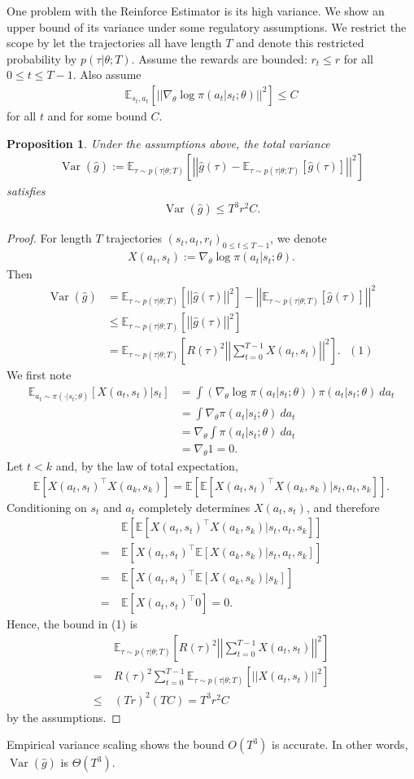 \documentclass[12pt,oneside]{article}
\newcommand{\norm}[1]{\left|\left|#1\right|\right|}
\newcommand{\BE}[0]{\mathbb{E}}
\newcommand{\ali}[1]{\begin{align*}#1\end{align*}}
\DeclareMathOperator{\Var}{Var}
\theoremstyle{plain}
\newtheorem*{prop}{Proposition}
\theoremstyle{remark}
\begin{document}
One problem with the Reinforce Estimator is its high variance. We show an upper bound of its variance under some regulatory assumptions. We restrict the scope by let the trajectories all have length $T$ and denote this restricted probability by $p(\tau | \theta; T)$. Assume the rewards are bounded: $r_t \leq r$ for all $0 \leq t \leq T-1$. Also assume 
\ali{\BE_{s_t, a_t} \left[ \norm{\nabla_\theta \log \pi(a_t|s_t;\theta)}^2 \right] \leq C}
for all $t$ and for some bound $C$.

\begin{prop}
Under the assumptions above, the total variance 
\ali{\Var(\hat{g}) := \BE_{\tau \sim p(\tau | \theta; T)} \left[ \norm{\hat{g}(\tau) - \BE_{\tau \sim p(\tau | \theta; T)} \left[\hat{g}(\tau) \right]}^2 \right]}
satisfies
\ali{\Var(\hat{g}) \leq T^3r^2C.}
\end{prop}
\begin{proof}
For length $T$ trajectories $(s_t, a_t, r_t)_{0 \leq t \leq T-1}$, we denote 
\ali{X(a_t, s_t) := \nabla_\theta \log \pi(a_t|s_t;\theta).}
Then
\ali{\Var(\hat{g}) &= \BE_{\tau \sim p(\tau | \theta; T)} \left[ \norm{\hat{g}(\tau)}^2 \right] - \norm{\BE_{\tau \sim p(\tau | \theta; T)} \left[ \hat{g}(\tau) \right]}^2 \\
                   &\leq \BE_{\tau \sim p(\tau | \theta; T)} \left[ \norm{\hat{g}(\tau)}^2 \right] \\
                   &= \BE_{\tau \sim p(\tau | \theta; T)} \left[ R(\tau)^2 \norm{\sum_{t=0}^{T-1} X(a_t, s_t)}^2  \right]. \ \ \ (1)}
We first note
\ali{\BE_{a_t \sim \pi(\cdot|s_t;\theta)} \left[ X(a_t, s_t) | s_t \right] &= \int (\nabla_\theta \log \pi(a_t|s_t;\theta)) \pi(a_t|s_t;\theta) \ d a_t\\
             &= \int \nabla_\theta \pi(a_t|s_t;\theta) \ d a_t\\
             &= \nabla_\theta \int \pi(a_t|s_t;\theta) \ d a_t \\
             &= \nabla_\theta 1 = 0. }
Let $t < k$ and, by the law of total expectation,
\ali{\BE \left[X(a_t, s_t)^\top X(a_k, s_k)\right] = \BE \left[ \BE \left[ X(a_t, s_t)^\top X(a_k, s_k) | s_t,a_t,s_k \right] \right].}
Conditioning on $s_t$ and $a_t$ completely determines $X(a_t, s_t)$, and therefore 
\ali{&\BE \left[ \BE \left[ X(a_t, s_t)^\top X(a_k, s_k) | s_t,a_t,s_k \right] \right] \\
= \  &\BE \left[  X(a_t, s_t)^\top \BE \left[ X(a_k, s_k) | s_t,a_t,s_k \right] \right] \\
= \ &\BE \left[  X(a_t, s_t)^\top \BE \left[ X(a_k, s_k) | s_k \right] \right] \\
= \ &\BE \left[  X(a_t, s_t)^\top 0 \right] = 0.}
Hence, the bound in (1) is
\ali{&\BE_{\tau \sim p(\tau | \theta; T)} \left[ R(\tau)^2 \norm{\sum_{t=0}^{T-1} X(a_t, s_t)}^2  \right] \\
= \ &R(\tau)^2 \sum_{t=0}^{T-1} \BE_{\tau \sim p(\tau | \theta; T)} \left[ \norm{X(a_t, s_t)}^2  \right] \\
\leq \ &(Tr)^2(TC) = T^3r^2C}
by the assumptions.

\end{proof}
Empirical variance scaling shows the bound $O(T^3)$ is accurate. In other words, $\Var(\hat{g})$ is $\Theta(T^3)$.\\
\end{document}
